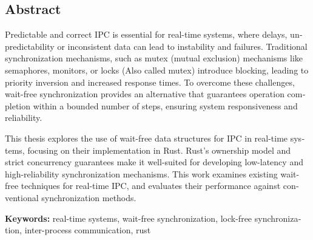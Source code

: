 \begin{otherlanguage}{english}
\chapter*{Abstract}


Predictable and correct \ac{IPC} is essential for real-time systems, where delays, unpredictability or inconsistent data can lead to instability and failures. Traditional synchronization mechanisms, such as mutex (mutual exclusion) mechanisms like semaphores, monitors, or locks (Also called mutex) introduce blocking, leading to priority inversion and increased response times. To overcome these challenges, wait-free synchronization provides an alternative that guarantees operation completion within a bounded number of steps, ensuring system responsiveness and reliability.

This thesis explores the use of wait-free data structures for \ac{IPC} in real-time systems, focusing on their implementation in Rust. Rust’s ownership model and strict concurrency guarantees make it well-suited for developing low-latency and high-reliability synchronization mechanisms. This work examines existing wait-free techniques for real-time \ac{IPC}, and evaluates their performance against conventional synchronization methods.

\vfill
\noindent\textbf{Keywords:} real-time systems, wait-free synchronization, lock-free synchronization, inter-process communication, rust
\vfill
\end{otherlanguage}
